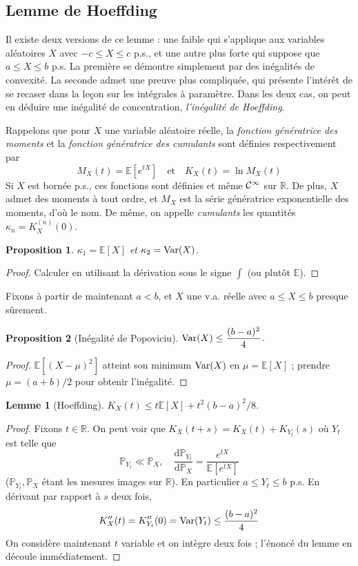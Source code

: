 \documentclass[a4paper, 11pt]{article}
\def\P{\mathbb{P}}
\def\R{\mathbb{R}}
\def\Cf{{\cal{C}}}
\def\E{\mathbb{E}}
\def\Var{\textnormal{Var}}
\newtheorem*{proposition}{Proposition}
\newtheorem*{lemma}{Lemme}
\begin{document}
\newpage



\subsection{Lemme de Hoeffding}

Il existe deux versions de ce lemme : une faible qui s'applique aux variables
aléatoires $X$ avec $-c \leq X \leq c$ p.s., et une autre plus forte qui suppose
que $a \leq X \leq b$ p.s. La première se démontre simplement par des inégalités
de convexité. La seconde admet une preuve plus compliquée, qui présente
l'intérêt de se recaser dans la leçon sur les intégrales à paramètre. Dans les
deux cas, on peut en déduire une inégalité de concentration, \emph{l'inégalité
  de Hoeffding}.

Rappelons que pour $X$ une variable aléatoire réelle, la \emph{fonction
  génératrice des moments} et la \emph{fonction génératrice des cumulants} sont
définies respectivement par
\[ M_X(t) = \E\left[ e^{tX} \right] \quad \text{et} \quad K_X(t) = \ln M_X(t) \]
Si $X$ est bornée p.s., ces fonctions sont définies et même $\Cf^\infty$ sur
$\R$. De plus, $X$ admet des moments à tout ordre, et $M_X$ est la série
génératrice exponentielle des moments, d'où le nom. De même, on appelle
\emph{cumulants} les quantités $\kappa_n = K_X^{(n)}(0)$.

\begin{proposition}
  $\kappa_1 = \E[X]$ et $\kappa_2 = \Var(X)$.
\end{proposition}
\begin{proof}
  Calculer en utilisant la dérivation sous le signe $\int$ (ou plutôt $\E$).
\end{proof}

Fixons à partir de maintenant $a < b$, et $X$ une v.a. réelle avec $a \leq X
\leq b$ presque sûrement.

\begin{proposition}[Inégalité de Popoviciu]
  $\displaystyle \Var(X) \leq \frac{(b-a)^2}{4}$.
\end{proposition}
\begin{proof}
  $\E[(X - \mu)^2]$ atteint son minimum $\Var(X)$ en $\mu = \E[X]$ ; prendre
  $\mu = (a+b)/2$ pour obtenir l'inégalité.
\end{proof}

\begin{lemma}[Hoeffding]
  $K_X(t) \leq t\E[X] + t^2(b-a)^2/8$.
\end{lemma}
\begin{proof}
  Fixons $t \in \R$. On peut voir que $K_X(t+s) = K_X(t) + K_{Y_t}(s)$ où $Y_t$
  est telle que
  \[ \P_{Y_t} \ll \P_X, \quad \frac{\mathrm{d}\P_{Y_t}}{\mathrm{d}\P_X} =
    \frac{e^{tX}}{\E\left[ e^{tX} \right]}\]
  ($\P_{Y_t}, \P_X$ étant les mesures images sur $\R$). En particulier $a \leq
  Y_t \leq b$ p.s. En dérivant par rapport à $s$ deux fois,
  \[ K_X''(t) = K_{Y_t}''(0) = \Var(Y_t) \leq \frac{(b-a)^2}{4} \]
  On considère maintenant $t$ variable et on intègre deux fois ; l'énoncé du
  lemme en découle immédiatement.
\end{proof}
\end{document}
